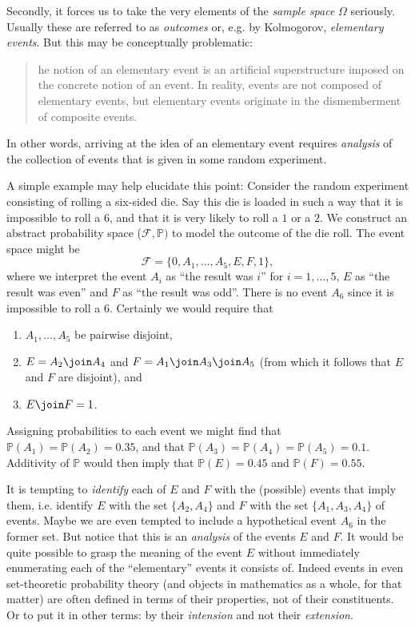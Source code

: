 \documentclass[article, a4paper, 11pt, oneside]{memoir}
\numberwithin{equation}{chapter}
\newcommand{\calF}{\mathcal{F}}
\renewcommand{\P}{\mathbb{P}}
\begin{document}
Secondly, it forces us to take the very elements of the \emph{sample space} $\Omega$ seriously. Usually these are referred to as \emph{outcomes} or, e.g. by Kolmogorov, \emph{elementary events}. But this may be conceptually problematic:
%
\blockquote[\cite{kolmogorov1995}]{
    he notion of an elementary event is an artificial superstructure imposed on the concrete notion of an event. In reality, events are not composed of elementary events, but elementary events originate in the dismemberment of composite events.
}
%
In other words, arriving at the idea of an elementary event requires \emph{analysis} of the collection of events that is given in some random experiment.

A simple example may help elucidate this point: Consider the random experiment consisting of rolling a six-sided die. Say this die is loaded in such a way that it is impossible to roll a $6$, and that it is very likely to roll a $1$ or a $2$. We construct an abstract probability space ($\calF, \P)$ to model the outcome of the die roll. The event space might be
%
\begin{equation*}
    \calF
        = \{ 0, A_1, \ldots, A_5, E, F, 1 \},
\end{equation*}
%
where we interpret the event $A_i$ as \enquote{the result was $i$} for $i = 1, \ldots, 5$, $E$ as \enquote{the result was even} and $F$ as \enquote{the result was odd}. There is no event $A_6$ since it is impossible to roll a $6$. Certainly we would require that
%
\begin{enumerate}
    \item $A_1, \ldots, A_5$ be pairwise disjoint,
    \item $E = A_2 \join A_4$ and $F = A_1 \join A_3 \join A_5$ (from which it follows that $E$ and $F$ are disjoint), and
    \item $E \join F = 1$.
\end{enumerate}
%
Assigning probabilities to each event we might find that $\P(A_1) = \P(A_2) = 0.35$, and that $\P(A_3) = \P(A_4) = \P(A_5) = 0.1$. Additivity of $\P$ would then imply that $\P(E) = 0.45$ and $\P(F) = 0.55$.

It is tempting to \emph{identify} each of $E$ and $F$ with the (possible) events that imply them, i.e. identify $E$ with the set $\{A_2, A_4\}$ and $F$ with the set $\{A_1, A_3, A_4\}$ of events. Maybe we are even tempted to include a hypothetical event $A_6$ in the former set. But notice that this is an \emph{analysis} of the events $E$ and $F$. It would be quite possible to grasp the meaning of the event $E$ without immediately enumerating each of the \enquote{elementary} events it consists of. Indeed events in even set-theoretic probability theory (and objects in mathematics as a whole, for that matter) are often defined in terms of their properties, not of their constituents. Or to put it in other terms: by their \emph{intension} and not their \emph{extension}.
\end{document}
